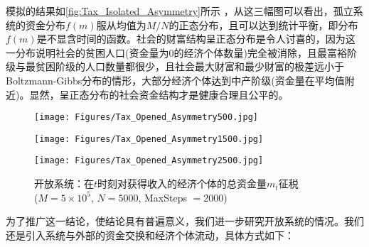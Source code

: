 \documentclass[tsinghuacite]{HustGraduPaper}
\begin{document}
		
		
		模拟的结果如\autoref{fig:Tax_Isolated_Asymmetry}所示	，从这三幅图可以看出，孤立系统的资金分布$f(m)$服从均值为$M/N$的正态分布，且可以达到统计平衡，即分布$f(m)$是不显含时间的函数。社会的财富结构呈正态分布是令人讨喜的，因为这一分布说明社会的贫困人口(资金量为$0$的经济个体数量)完全被消除，且最富裕阶级与最贫困阶级的人口数量都很少，且社会最大财富和最少财富的极差远小于Boltzmann-Gibbs分布的情形，大部分经济个体达到中产阶级(资金量在平均值附近)。显然，呈正态分布的社会资金结构才是健康合理且公平的。
		
		
		\begin{figure}[htbp]
			\centering                                                 
			\begin{minipage}[t]{0.49\textwidth}                                                      
			\texttt{[image: Figures/Tax\_Opened\_Asymmetry500.jpg]}               
			\end{minipage}
			\begin{minipage}[t]{0.49\textwidth}                 
			\texttt{[image: Figures/Tax\_Opened\_Asymmetry1500.jpg]}               
			\end{minipage}
			
			\begin{minipage}[t]{0.49\textwidth}                 
			\texttt{[image: Figures/Tax\_Opened\_Asymmetry2500.jpg]}               
			\end{minipage}

			\caption{开放系统：在$t$时刻对获得收入的经济个体的总资金量$m_t$征税 \\ ($M = 5 \times 10^5$, $N = 5000$, MaxSteps $= 2000$)} 
			\label{fig:Tax_Opened_Asymmetry}                                                        
		\end{figure}
	
		
		
		为了推广这一结论，使结论具有普遍意义，我们进一步研究开放系统的情况。我们还是引入系统与外部的资金交换和经济个体流动，具体方式如下：
\end{document}
